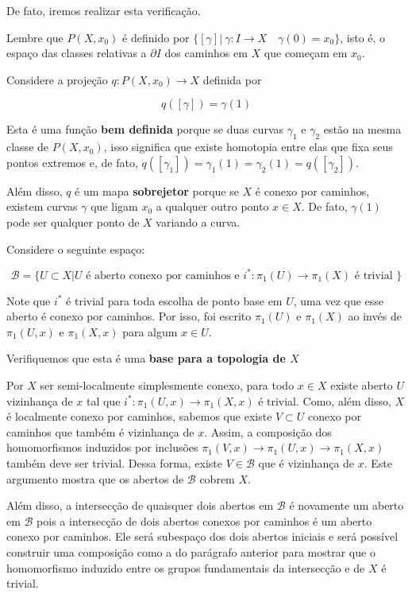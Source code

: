 \begin{dem}
    De fato, iremos realizar esta verificação. 

    Lembre que $P(X,x_0)$ é definido por $\{[\gamma]| ~\gamma:I\rightarrow X\text{ ~ }\gamma(0)=x_0\}$, isto é, o espaço das classes relativas a $\partial I$ dos caminhos em $X$ que começam em $x_0$.

    Considere a projeção $q: P(X,x_0)\rightarrow X$ definida por 

    $$q([\gamma])=\gamma(1)$$

    Esta é uma função \textbf{bem definida} porque se duas curvas $\gamma_1$ e $\gamma_2$ estão na mesma classe de $P(X,x_0)$, isso significa que existe homotopia entre elas que fixa seus pontos extremos e, de fato, $q([\gamma_1])=\gamma_1(1)=\gamma_2(1)=q([\gamma_2])$.

    Além disso, $q$ é um mapa \textbf{sobrejetor} porque se $X$ é conexo por caminhos, existem curvas $\gamma$ que ligam $x_0$ a qualquer outro ponto $x\in X$. De fato, $\gamma(1)$ pode ser qualquer ponto de $X$ variando a curva.

    Considere o seguinte espaço:

    $$\mathcal{B}=\{U\subset X | U \text{ é aberto conexo por caminhos e } i^*:\pi_1(U)\rightarrow \pi_1(X)\text{ é trivial }\}$$

    Note que $i^*$ é trivial para toda escolha de ponto base em $U$, uma vez que esse aberto é conexo por caminhos. Por isso, foi escrito $\pi_1(U)$ e  $\pi_1(X)$ ao invés de  $\pi_1(U,x)$ e  $\pi_1(X,x)$ para algum $x\in U$.

    Verifiquemos que esta é uma \textbf{base para a topologia de $X$}

     Por $X$ ser semi-localmente simplesmente conexo, para todo $x\in X$ existe aberto $U$ vizinhança de $x$ tal que $i^*:\pi_1(U,x)\rightarrow \pi_1(X,x)$ é trivial. Como, além disso, $X$ é localmente conexo por caminhos, sabemos que existe $V\subset U$ conexo por caminhos que também é vizinhança de $x$. Assim, a composição dos homomorfismos induzidos por inclusões $\pi_1(V,x)\rightarrow \pi_1(U,x)\rightarrow \pi_1(X,x)$ também deve ser trivial. Dessa forma, existe $V\in \mathcal{B}$ que é vizinhança de $x$. Este argumento mostra que os abertos de $\mathcal{B}$ cobrem $X$.

     Além disso, a intersecção de quaisquer dois abertos em $\mathcal{B}$ é novamente um aberto em $\mathcal{B}$ pois a intersecção de dois abertos conexos por caminhos é um aberto conexo por caminhos. Ele será subespaço dos dois abertos iniciais e será possível construir uma composição como a do parágrafo anterior para mostrar que o homomorfismo induzido entre os grupos fundamentais da intersecção e de $X$ é trivial.


\end{dem}
